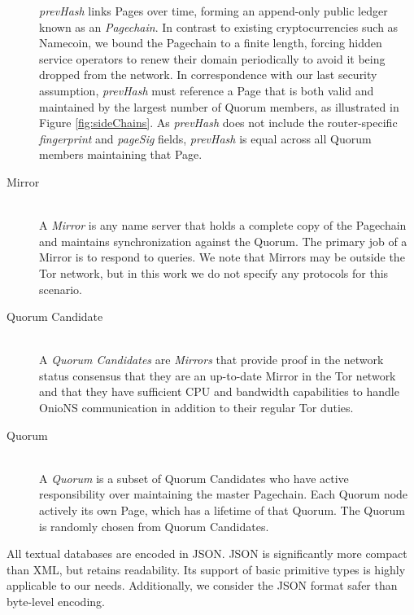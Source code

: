 \documentclass{sig-alternate}
\begin{document}
\begin{description}
		\emph{prevHash} links Pages over time, forming an append-only public ledger known as an \emph{Pagechain}. In contrast to existing cryptocurrencies such as Namecoin, we bound the Pagechain to a finite length, forcing hidden service operators to renew their domain periodically to avoid it being dropped from the network. In correspondence with our last security assumption, \emph{prevHash} must reference a Page that is both valid and maintained by the largest number of Quorum members, as illustrated in Figure \ref{fig:sideChains}. As \emph{prevHash} does not include the router-specific \emph{fingerprint} and \emph{pageSig} fields, \emph{prevHash} is equal across all Quorum members maintaining that Page.

	\item[Mirror] \hfill \\
		A \emph{Mirror} is any name server that holds a complete copy of the Pagechain and maintains synchronization against the Quorum. The primary job of a Mirror is to respond to queries. We note that Mirrors may be outside the Tor network, but in this work we do not specify any protocols for this scenario.

	\item[Quorum Candidate] \hfill \\
		A \emph{Quorum Candidates} are \emph{Mirrors} that provide proof in the network status consensus that they are an up-to-date Mirror in the Tor network and that they have sufficient CPU and bandwidth capabilities to handle OnioNS communication in addition to their regular Tor duties.

	\item[Quorum] \hfill \\
		A \emph{Quorum} is a subset of Quorum Candidates who have active responsibility over maintaining the master Pagechain. Each Quorum node actively its own Page, which has a lifetime of that Quorum. The Quorum is randomly chosen from Quorum Candidates.
\end{description}

All textual databases are encoded in JSON. JSON is significantly more compact than XML, but retains readability. Its support of basic primitive types is highly applicable to our needs. Additionally, we consider the JSON format safer than byte-level encoding.
\end{document}
